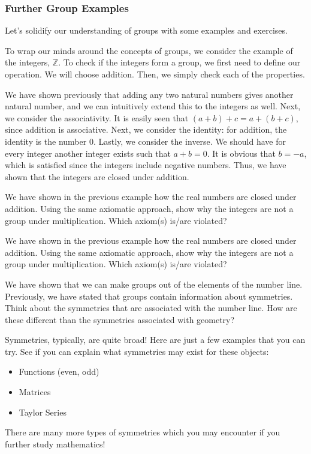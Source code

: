 \subsubsection{Further Group Examples}

Let's solidify our understanding of groups with some examples and exercises.

\begin{example}
    To wrap our minds around the concepts of groups, we consider the example of the integers, $\mathbb{Z}$. To check if the integers form a group, we first need to define our operation. We will choose addition. Then, we simply check each of the properties. 
    
    We have shown previously that adding any two natural numbers gives another natural number, and we can intuitively extend this to the integers as well. Next, we consider the associativity. It is easily seen that $(a+b)+c=a+(b+c)$, since addition is associative. Next, we consider the identity: for addition, the identity is the number $0$. Lastly, we consider the inverse. We should have for every integer another integer exists such that $a+b=0$. It is obvious that $b=-a$, which is satisfied since the integers include negative numbers. Thus, we have shown that the integers are closed under addition.
\end{example}

\begin{exercise}
We have shown in the previous example how the real numbers are closed under addition. Using the same axiomatic approach,  show why the integers are not a group under multiplication. Which axiom(s) is/are violated?
\end{exercise}
\begin{exercise}
We have shown in the previous example how the real numbers are closed under addition. Using the same axiomatic approach,  show why the integers are not a group under multiplication. Which axiom(s) is/are violated?
\end{exercise}

\begin{exercise}
    We have shown that we can make groups out of the elements of the number line. Previously, we have stated that groups contain information about symmetries. Think about the symmetries that are associated with the number line. How are these different than the symmetries associated with geometry? 
    
    Symmetries, typically, are quite broad! Here are just a few examples that you can try. See if you can explain what symmetries may exist for these objects:
    \begin{itemize}
        \item Functions (even, odd)
        \item Matrices
        \item Taylor Series
    \end{itemize}
There are many more types of symmetries which you may encounter if you further study mathematics!
\end{exercise}


